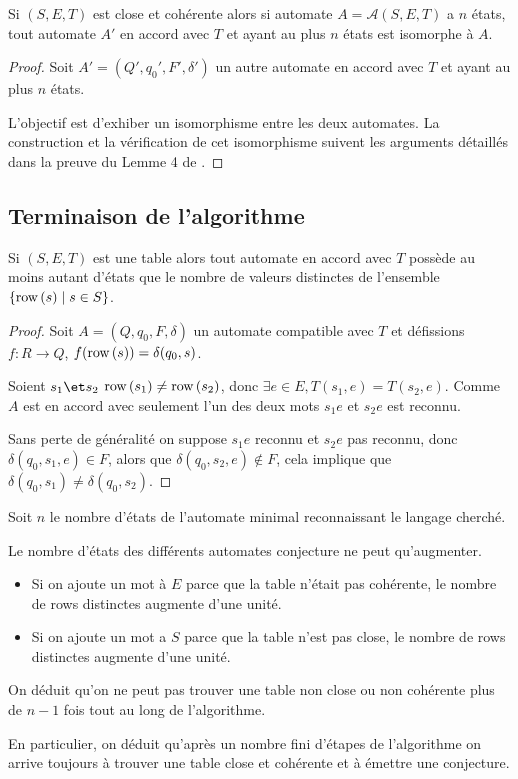 \begin{lemma}
	Si $(S,E,T)$ est close et cohérente alors si automate $A = \mathcal A (S,E,T)$
	a $n$ états, tout automate $A'$ en accord avec $T$ et ayant au plus $n$ états est isomorphe à $A$.
\end{lemma}

\begin{proof}
	Soit $A' = (Q', q_0', F', \delta')$ un autre automate en accord avec $T$ et ayant au plus $n$ états.

	L'objectif est d'exhiber un isomorphisme entre les deux automates. \en	La construction et la vérification
	de cet isomorphisme suivent les arguments détaillés dans la preuve du Lemme 4 de \cite{angluinLearning}.
\end{proof}

\subsection{Terminaison de l'algorithme}

\begin{lemma}
	Si $(S,E,T)$ est une table alors tout automate en accord avec $T$ possède au
	moins autant d'états que le nombre de valeurs distinctes de l'ensemble $\left\{\text{row}\left(s\right) \mid s \in S\right\}$.
\end{lemma}

\begin{proof}
	Soit $A = (Q,q_0,F,\delta)$ un automate compatible avec $T$ et défissions
	$f: R \to Q$, $f(\text{row}\left(s\right)) = \delta(q_0, s)$.

	Soient $s_1 \et s_2$ \tq $\text{row}\left(s_1\right) \neq \text{row}\left(s_2\right)$, donc $\exists e \in E, T(s_1,e) = T(s_2,e)$.
	Comme $A$ est en accord avec seulement l'un des deux mots $s_1e$ et $s_2e$ est reconnu.

	Sans perte de généralité on suppose $s_1e$ reconnu et $s_2e$ pas reconnu, donc
	$\delta (q_0, s_1, e) \in F$, alors que $\delta (q_0,s_2,e) \notin F$, cela implique que
	$\delta (q_0,s_1) \neq \delta (q_0,s_2)$.

\end{proof}

Soit $n$ le nombre d'états de l'automate minimal reconnaissant le langage cherché.

\begin{remarque}
	Le nombre d'états des différents automates conjecture ne peut qu'augmenter.
	\begin{itemize}
		\item Si on ajoute un mot à $E$ parce que la table n'était pas cohérente, le nombre de rows distinctes augmente
		      d'une unité.
		\item Si on ajoute un mot a $S$ parce que la table n'est pas close, le nombre de rows distinctes augmente d'une unité.
	\end{itemize}
	On déduit qu'on ne peut pas trouver une table non close ou non cohérente plus de $n-1$ fois tout au long de l'algorithme.

	En particulier, on déduit qu'après un nombre fini d'étapes de l'algorithme on arrive toujours à trouver
	une table close et cohérente et à émettre une conjecture.
\end{remarque}


